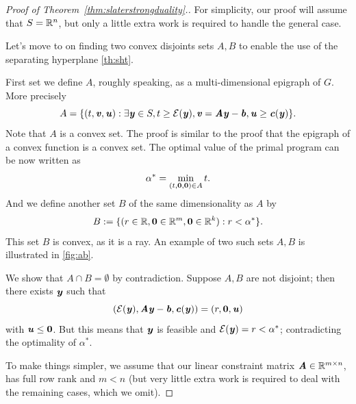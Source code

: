 \begin{proof}[Proof of Theorem~\ref{thm:slaterstrongduality}.]
  For simplicity, our proof will assume that $S = \mathbb{R}^n$, but only a little
  extra work is required to handle the general case.

  Let's move to on finding two convex disjoints sets $A, B$ to enable the use of the separating hyperplane \autoref{th:sht}.

First set we define $A$, roughly speaking, as a multi-dimensional epigraph of
$G$. More precisely
\begin{equation*} A = \{(t, \boldsymbol{\mathit{v}}, \boldsymbol{\mathit{u}}) : \exists \boldsymbol{\mathit{y}} \in S, t \geq \mathcal{E}(\boldsymbol{\mathit{y}}), \boldsymbol{\mathit{v}} = \boldsymbol{\mathit{A}}\boldsymbol{\mathit{y}} - \boldsymbol{\mathit{b}}, \boldsymbol{\mathit{u}} \geq \boldsymbol{\mathit{c}}(\boldsymbol{\mathit{y}})\}. \end{equation*}
Note that $A$ is a convex set. The proof is similar to the proof that the epigraph of a convex function is a convex set.
The optimal value of the primal program can be now written as
\begin{equation*} \alpha^* = \min_{(t,\boldsymbol{0},\boldsymbol{0}) \in A} t. \end{equation*}
And we define another set $B$ of the same dimensionality as $A$ by
\begin{equation*} B := \{(r \in \mathbb{R}, \boldsymbol{0} \in \mathbb{R}^m, \boldsymbol{0} \in \mathbb{R}^k) : r < \alpha^* \}. \end{equation*}
This set $B$ is convex, as it is a ray.
An example of two such sets $A,B$ is illustrated in \autoref{fig:ab}.

We show that $A \cap B = \emptyset$ by contradiction.
Suppose $A, B$ are not disjoint; then there exists $\boldsymbol{\mathit{y}}$ such that
\begin{equation*} (\mathcal{E}(\boldsymbol{\mathit{y}}), \boldsymbol{\mathit{A}}\boldsymbol{\mathit{y}}-\boldsymbol{\mathit{b}}, \boldsymbol{\mathit{c}}(\boldsymbol{\mathit{y}})) = (r, \boldsymbol{0}, \boldsymbol{\mathit{u}}) \end{equation*}
with $\boldsymbol{\mathit{u}} \leq \boldsymbol{0}$.
But this means that $\boldsymbol{\mathit{y}}$ is feasible and  $\mathcal{E}(\boldsymbol{\mathit{y}}) = r < \alpha^*$; contradicting the optimality of $\alpha^*$.

To make things simpler,
we assume that our linear constraint matrix $\boldsymbol{\mathit{A}} \in \mathbb{R}^{m\times n}$,
has full row rank and $m < n$ (but very little extra work is required to
deal with the remaining cases, which we omit).


\end{proof}
